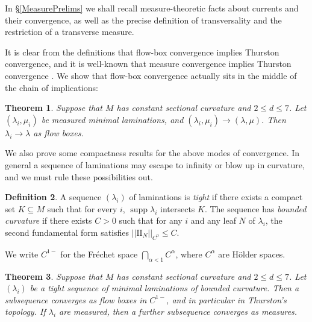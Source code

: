 \documentclass[reqno,11pt]{amsart}
\DeclareMathOperator{\supp}{supp}
\newcommand{\Two}{\mathrm{I\!I}}
\newcommand{\dfn}[1]{\emph{#1}\index{#1}}
\newtheorem{theorem}{Theorem}[section]
\theoremstyle{definition}
\newtheorem{definition}[theorem]{Definition}
\numberwithin{equation}{section}
\begin{document}
In \S\ref{MeasurePrelims} we shall recall measure-theoretic facts about currents and their convergence, as well as the precise definition of transversality and the restriction of a transverse measure.

It is clear from the definitions that flow-box convergence implies Thurston convergence, and it is well-known that measure convergence implies Thurston convergence \cite[Proposition 8.10.3]{thurston1979geometry}.
We show that flow-box convergence actually sits in the middle of the chain of implications:

\begin{theorem}\label{implication theorem}
Suppose that $M$ has constant sectional curvature and $2 \leq d \leq 7$.
Let $(\lambda_i, \mu_i)$ be measured minimal laminations, and $(\lambda_i, \mu_i) \to (\lambda, \mu)$. Then $\lambda_i \to \lambda$ as flow boxes.
\end{theorem}

We also prove some compactness results for the above modes of convergence.
In general a sequence of laminations may escape to infinity or blow up in curvature, and we must rule these possibilities out.

\begin{definition}
A sequence $(\lambda_i)$ of laminations is \dfn{tight} if there exists a compact set $K \subseteq M$ such that for every $i$, $\supp \lambda_i$ intersects $K$.
The sequence has \dfn{bounded curvature} if there exists $C > 0$ such that for any $i$ and any leaf $N$ of $\lambda_i$, the second fundamental form satisfies $||\Two_N||_{C^0} \leq C$.
\end{definition}

We write $C^{1-}$ for the Fr\'echet space $\bigcap_{\alpha < 1} C^\alpha$, where $C^\alpha$ are H\"older spaces.

\begin{theorem}\label{compactness theorem}
Suppose that $M$ has constant sectional curvature and $2 \leq d \leq 7$.
Let $(\lambda_i)$ be a tight sequence of minimal laminations of bounded curvature.
Then a subsequence converges as flow boxes in $C^{1-}$, and in particular in Thurston's topology.
If $\lambda_i$ are measured, then a further subsequence converges as measures.
\end{theorem}



\end{document}
